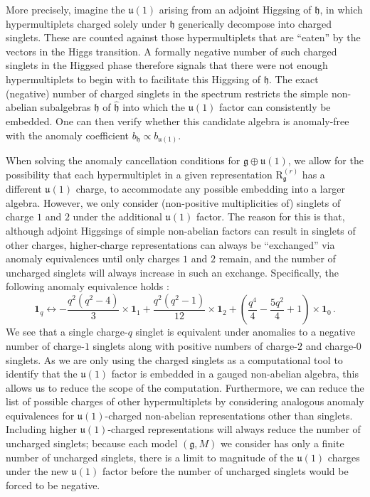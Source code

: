 \documentclass[11pt, a4paper]{article}
\newcommand*{\fkg}{\ensuremath{\mathfrak{g}}}
\newcommand*{\fkh}{\ensuremath{\mathfrak{h}}}
\newcommand*{\fku}{\ensuremath{\mathfrak{u}}}
\newcommand*{\irrep}[2]{\ensuremath{\bm{\mathrm{R}}_{#1}^{(#2)}}}
\begin{document}
More precisely, imagine the $\fku(1)$ arising from an adjoint Higgsing of $\fkh$, in which hypermultiplets charged solely under $\fkh$ generically decompose into charged singlets.
These are counted against those hypermultiplets that are ``eaten'' by the vectors in the Higgs transition.
A formally negative number of such charged singlets in the Higgsed phase therefore signals that there were not enough hypermultiplets to begin with to facilitate this Higgsing of $\fkh$.
The exact (negative) number of charged singlets in the spectrum restricts the simple non-abelian subalgebras $\fkh$ of $\hat{\fkh}$ into which the $\fku(1)$ factor can consistently be embedded.
One can then verify whether this candidate algebra is anomaly-free with the anomaly coefficient $b_\fkh \propto b_{\fku(1)}$.

When solving the anomaly cancellation conditions for $\fkg \oplus \fku(1)$, we allow for the possibility that each hypermultiplet in a given representation $\irrep{\fkg}{r}$ has a different $\fku(1)$ charge, to accommodate any possible embedding into a larger algebra. However, we only consider (non-positive multiplicities of) singlets of charge $1$ and $2$ under the additional $\fku(1)$ factor. The reason for this is that, although adjoint Higgsings of simple non-abelian factors can result in singlets of other charges, higher-charge representations can always be ``exchanged'' via anomaly equivalences until only charges $1$ and $2$ remain, and the number of uncharged singlets will always increase in such an exchange. Specifically, the following anomaly equivalence holds \cite{TaylorTurnerGeneric}:
    \begin{equation}
        \label{eq:u1-equivalence}
        \bm{1}_q
        \longleftrightarrow
        -\frac{q^2 \left(q^2 - 4\right)}{3} \times \bm{1}_1 +
        \frac{q^2 \left(q^2 - 1\right)}{12} \times \bm{1}_2 +
        \left(\frac{q^4}{4} - \frac{5 q^2}{4} + 1\right) \times \bm{1}_0\,.
    \end{equation}
We see that a single charge-$q$ singlet is equivalent under anomalies to a negative number of charge-$1$ singlets along with  positive numbers of charge-$2$ and charge-$0$ singlets. As we are only using the charged singlets as a computational tool to identify that the $\fku(1)$ factor is embedded in a gauged non-abelian algebra, this allows us to reduce the scope of the computation. Furthermore, we can reduce the list of possible charges of other hypermultiplets by considering analogous anomaly equivalences for $\fku(1)$-charged non-abelian representations other than singlets. Including higher $\fku(1)$-charged representations will always reduce the number of uncharged singlets; because each model $(\fkg, M)$ we consider has only a finite number of uncharged singlets, there is a limit to magnitude of the $\fku(1)$ charges under the new $\fku(1)$ factor before the number of uncharged singlets would be forced to be negative.
\end{document}
